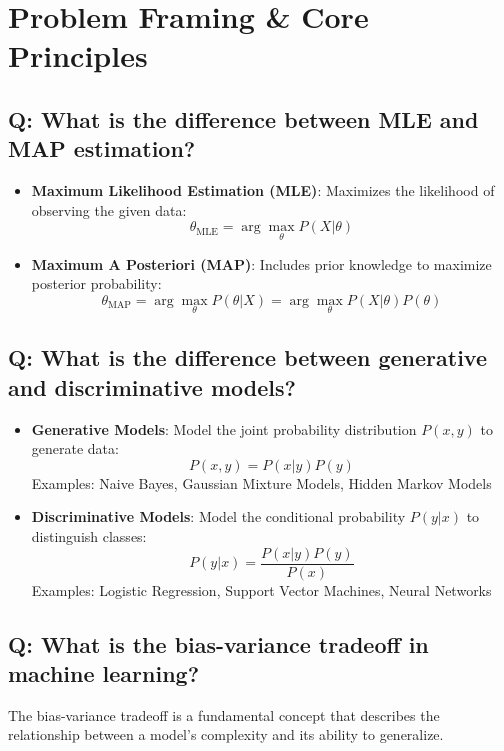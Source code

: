 \section{Problem Framing \& Core Principles}

\subsection*{\textcolor{primaryteal}{Q: What is the difference between MLE and MAP estimation?}}
\begin{itemize}
  \item \textbf{Maximum Likelihood Estimation (MLE)}: Maximizes the likelihood of observing the given data:
    \[
    \theta_{\text{MLE}} = \arg\max_{\theta} P(X|\theta)
    \]
  \item \textbf{Maximum A Posteriori (MAP)}: Includes prior knowledge to maximize posterior probability:
    \[
    \theta_{\text{MAP}} = \arg\max_{\theta} P(\theta|X) = \arg\max_{\theta} P(X|\theta)P(\theta)
    \]
\end{itemize}

\subsection*{\textcolor{primaryteal}{Q: What is the difference between generative and discriminative models?}}
\begin{itemize}
  \item \textbf{Generative Models}: Model the joint probability distribution $P(x, y)$ to generate data:
    \[
    P(x, y) = P(x|y)P(y)
    \]
    Examples: Naive Bayes, Gaussian Mixture Models, Hidden Markov Models
  
  \item \textbf{Discriminative Models}: Model the conditional probability $P(y|x)$ to distinguish classes:
    \[
    P(y|x) = \frac{P(x|y)P(y)}{P(x)}
    \]
    Examples: Logistic Regression, Support Vector Machines, Neural Networks
\end{itemize}

\subsection*{\textcolor{primaryteal}{Q: What is the bias-variance tradeoff in machine learning?}}
The bias-variance tradeoff is a fundamental concept that describes the relationship between a model's complexity and its ability to generalize.

